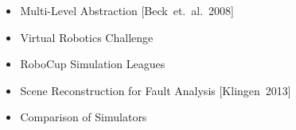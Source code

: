 \documentclass[]{beamer}
\begin{document}
\begin{frame}
\begin{columns}
\begin{overlayarea}{\textwidth}{0.8\textheight}
    ~
    \\
    ~
    ~
    \end{overlayarea}
    \begin{overlayarea}{\textwidth}{0.6\textheight}
      \begin{itemize}
      \item Multi-Level Abstraction [Beck~et.~al.~2008]
        \pause
      \item Virtual Robotics Challenge
        \pause
      \item RoboCup Simulation Leagues
        \pause
      \item Scene Reconstruction for Fault Analysis [Klingen~2013]
        \pause
      \item Comparison of Simulators
      \end{itemize}
    \end{overlayarea}
  \end{columns}
\end{frame}
\end{document}
